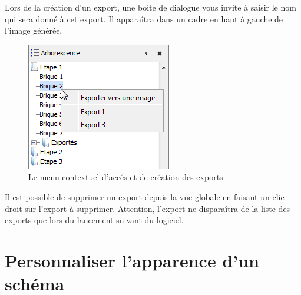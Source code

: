 Lors de la création d'un export, une boite de dialogue vous invite à saisir le nom qui sera donné à cet export. Il apparaîtra dans un cadre en haut à gauche de l'image générée.\\


\begin{figure}[h!]
\centering
\includegraphics[scale=0.75]{images/menu_export.png}
\caption{Le menu contextuel d'accés et de création des exports.}
\end{figure}

Il est possible de supprimer un export depuis la vue globale en faisant un clic droit sur l'export à supprimer. Attention, l'export ne disparaîtra de la liste des exports que lors du lancement suivant du logiciel. 

\section{Personnaliser l'apparence d'un schéma}

